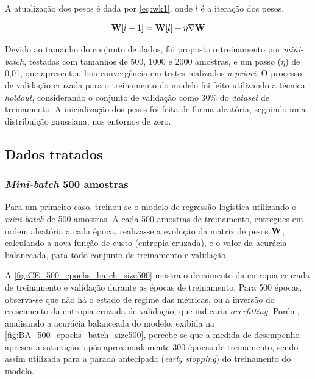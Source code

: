 A atualização dos pesos é dada por \eqref{eq:wk1}, onde $l$ é a iteração dos pesos.

\begin{equation}\label{eq:wk1}
	\mathbf{W}[l+1] = \mathbf{W}[l] - \eta\nabla\mathbf{W}
\end{equation}

Devido ao tamanho do conjunto de dados, foi proposto o treinamento por \textit{mini-batch}, testadas com tamanhos de 500, 1000 e 2000 amostras, e um passo ($\eta$) de 0,01, que apresentou boa convergência em testes realizados \textit{a priori}. O processo de validação cruzada para o treinamento do modelo foi feito utilizando a técnica \textit{holdout}, considerando o conjunto de validação como 30\% do \textit{dataset} de treinamento. A inicialização dos pesos foi feita de forma aleatória, seguindo uma distribuição gaussiana, nos entornos de zero.



\clearpage
\subsection{Dados tratados}

\subsubsection*{\textit{Mini-batch} 500 amostras}

Para um primeiro caso, treinou-se o modelo de regressão logística utilizando o \textit{mini-batch} de 500 amostras. A cada 500 amostras de treinamento, entregues em ordem aleatória a cada época, realiza-se a evolução da matriz de pesos $\mathbf{W}$, calculando a nova função de custo (entropia cruzada), e o valor da acurácia balanceada, para todo conjunto de treinamento e validação.

A \autoref{fig:CE_500_epochs_batch_size500} mostra o decaimento da entropia cruzada de treinamento e validação durante as épocas de treinamento. Para 500 épocas, observa-se que não há o estado de regime das métricas, ou a inversão do crescimento da entropia cruzada de validação, que indicaria \textit{overfitting}. Porém, analisando a acurácia balanceada do modelo, exibida na \autoref{fig:BA_500_epochs_batch_size500}, percebe-se que a medida de desempenho apresenta saturação, após aproximadamente 300 épocas de treinamento, sendo assim utilizada para a parada antecipada (\textit{early stopping}) do treinamento do modelo.

